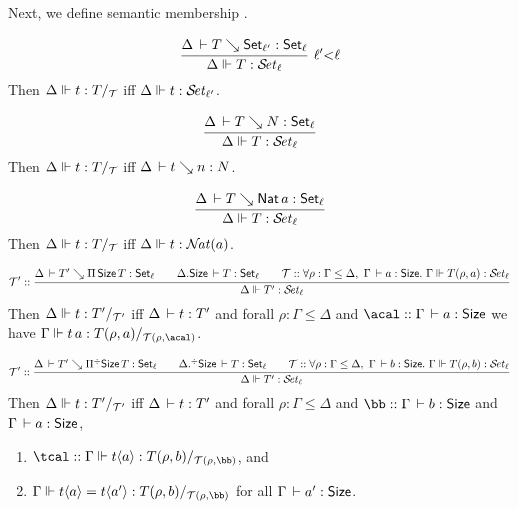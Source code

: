 \documentclass[acmlarge,review,anonymous]{acmart}\settopmatter{printfolios=true}
\begin{document}
Next, we define semantic membership .
\begin{caselist}

\nextcase
\[
  \rux{\Delta \der T \evalsto \Set[\ell'] : \Set[\ell]
     }{\sty \Delta T \ell
     }{\ell' {<} \ell}
\]
Then $\Delta \Vdash t : T /_{\mathcal{T}}$ iff $\Delta \Vdash t : {\mathcal{S}\!\mathit{et}_{\ell'}}$.

\nextcase
\[
  \ru{\Delta \der T \evalsto N : \Set[\ell]
    }{\sty \Delta T \ell}
\]
Then $\Delta \Vdash t : T /_{\mathcal{T}}$ iff $\Delta \,\vdash t \searrow n : N$.

\nextcase
\[
  \ru{\Delta \der T \evalsto \Nat a : \Set[\ell]
    }{\sty \Delta T \ell}
\]
Then $\Delta \Vdash t : T /_{\mathcal{T}}$ iff $\Delta \Vdash t : {\mathcal{N}\!\mathit{at}}(a)$.

\nextcase %
\[
  \T' ::
  \rul{\Delta \der T' \evalsto \piT \Size T : \Set[\ell] \qquad
       \cext \Delta \Size \der T : \Set[\ell] \qquad
      \T :: \forall \rho : \Gamma \leq \Delta,~\Gamma \der a : \Size.~
        \sty \Gamma {T(\rho,a)} \ell \\
    }{\sty \Delta {T'} \ell}
\]
Then $\Delta \Vdash t : T' /_{\mathcal{T}'}$ iff $\Delta \,\vdash t : T'$ and
forall $\rho : \Gamma \leq \Delta$ and $\acal :: \Gamma \der a : \Size$
we have $\sttmd \Gamma {t\,a} {T(\rho,a)} {\T(\rho,\acal)}$.

\nextcase %
\[
  \T' ::
  \rul{\Delta \der T' \evalsto \erpiT \Size T : \Set[\ell] \qquad
       \erext \Delta \Size \der T : \Set[\ell] \qquad
      \T :: \forall \rho : \Gamma \leq \Delta,~\Gamma \der b : \Size.~
        \sty \Gamma {T(\rho,b)} \ell \\
    }{\sty \Delta {T'} \ell}
\]
Then $\Delta \Vdash t : T' /_{\mathcal{T}'}$ iff $\Delta \,\vdash t : T'$ and
forall $\rho : \Gamma \leq \Delta$ and $\bb :: \Gamma \der b : \Size$ and  $\Gamma \,\vdash a : \mathsf{Size}$,
\begin{enumerate}
\item $\tcal :: \sttmd \Gamma {t \ann a} {T(\rho,b)} {\T(\rho,\bb)}$, and
\item $\sttmeqd \Gamma {t \ann a} {t \ann {a'}} {T(\rho,b)} {\T(\rho,\bb)} {\tcal}$ for all $\Gamma \,\vdash a' : \mathsf{Size}$.
\end{enumerate}



\end{caselist}
\end{document}

